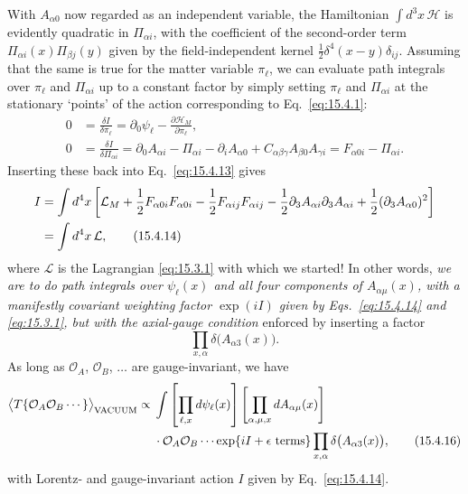 With $A_{\alpha0}$ now regarded as an independent variable, the Hamiltonian
$\int d^3x\,\mathcal H$ is evidently quadratic in $\Pi_{\alpha i}$, with the
coefficient of the second-order term $\Pi_{\alpha i}(x)\Pi_{\beta j}(y)$ given
by the field-independent kernel $\tfrac12\delta^4(x-y)\delta_{ij}$. Assuming
that the same is true for the matter variable $\pi_\ell$, we can evaluate path
integrals over $\pi_\ell$ and $\Pi_{\alpha i}$ up to a constant factor by
simply setting $\pi_\ell$ and $\Pi_{\alpha i}$ at the stationary `points' of
the action corresponding to Eq.~\eqref{eq:15.4.1}:
\begin{align*}
  0&=\frac{\delta I}{\delta\pi_\ell}
  =\partial_0\psi_\ell-\frac{\partial\mathcal H_M}{\partial\pi_\ell},\\
  0&=\frac{\delta I}{\delta\Pi_{\alpha i}}
  =\partial_0A_{\alpha i}-\Pi_{\alpha i}-\partial_iA_{\alpha0}
  +C_{\alpha\beta\gamma}A_{\beta0}A_{\gamma i}
  =F_{\alpha0i}-\Pi_{\alpha i}.
\end{align*}
Inserting these back into Eq.~\eqref{eq:15.4.13} gives
\begin{align}
  I&=\int d^4x\left[\mathcal L_M+\frac12F_{\alpha0i}F_{\alpha0i}
  -\frac12F_{\alpha ij}F_{\alpha ij}
  -\frac12\partial_3A_{\alpha i}\partial_3A_{\alpha i}
  +\frac12(\partial_3A_{\alpha0})^2\right]
  \notag\\
  &=\int d^4x\,\mathcal L,
  \tag{15.4.14}\label{eq:15.4.14}
\end{align}
where $\mathcal L$ is the Lagrangian \eqref{eq:15.3.1} with which we started!
In other words, \emph{we are to do path integrals over $\psi_\ell(x)$ and all
four components of $A_{\alpha\mu}(x)$, with a manifestly covariant weighting
factor $\exp(iI)$ given by Eqs.~\eqref{eq:15.4.14} and \eqref{eq:15.3.1}, but
with the axial-gauge condition} enforced by inserting a factor
\begin{equation}
  \prod_{x,\alpha}\delta\bigl(A_{\alpha3}(x)\bigr).
  \tag{15.4.15}\label{eq:15.4.15}
\end{equation}
As long as $\mathcal O_A$, $\mathcal O_B$, $\ldots$ are gauge-invariant, we have
\begin{align}
  \bigl\langle T\{\mathcal O_A\mathcal O_B\cdots\}\bigr\rangle_{\mathrm{VACUUM}}
  \propto{}&\int\left[\prod_{\ell,x}d\psi_\ell(x)\right]
  \left[\prod_{\alpha,\mu,x}dA_{\alpha\mu}(x)\right]
  \notag\\
  &\cdot\mathcal O_A\mathcal O_B\cdots
  \exp\{iI+\epsilon\text{ terms}\}
  \prod_{x,\alpha}\delta\bigl(A_{\alpha3}(x)\bigr),
  \tag{15.4.16}\label{eq:15.4.16}
\end{align}
with Lorentz- and gauge-invariant action $I$ given by Eq.~\eqref{eq:15.4.14}.

